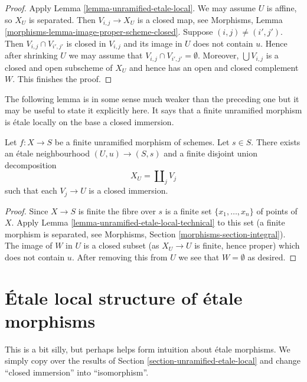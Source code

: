 \begin{proof}
Apply
Lemma \ref{lemma-unramified-etale-local}.
We may assume $U$ is affine, so $X_U$ is separated.
Then $V_{i, j} \to X_U$ is a closed map, see
Morphisms, Lemma \ref{morphisms-lemma-image-proper-scheme-closed}.
Suppose $(i, j) \not = (i', j')$.
Then $V_{i, j} \cap V_{i', j'}$ is closed in $V_{i, j}$ and
its image in $U$ does not contain $u$.
Hence after shrinking $U$ we may assume that
$V_{i, j} \cap V_{i', j'} = \emptyset$. Moreover, $\bigcup V_{i, j}$ is
a closed and open subscheme of $X_U$ and hence has an open and closed
complement $W$. This finishes the proof.
\end{proof}

\noindent
The following lemma is in some sense much weaker than the preceding one
but it may be useful to state it explicitly here. It says that a finite
unramified morphism is \'etale locally on the base a closed immersion.

\begin{lemma}
\label{lemma-finite-unramified-etale-local}
Let $f : X \to S$ be a finite unramified morphism of schemes.
Let $s \in S$.
There exists an \'etale neighbourhood $(U, u) \to (S, s)$
and a finite disjoint union decomposition
$$
X_U = \coprod\nolimits_j V_j
$$
such that each $V_j \to U$ is a closed immersion.
\end{lemma}

\begin{proof}
Since $X \to S$ is finite the fibre over $s$ is a finite set
$\{x_1, \ldots, x_n\}$ of points of $X$. Apply
Lemma \ref{lemma-unramified-etale-local-technical}
to this set (a finite morphism is separated, see
Morphisms, Section \ref{morphisms-section-integral}).
The image of $W$ in $U$ is a closed
subset (as $X_U \to U$ is finite, hence proper) which does not
contain $u$. After removing this from $U$ we see that $W = \emptyset$
as desired.
\end{proof}




\section{\'Etale local structure of \'etale morphisms}
\label{section-etale-local-etale}

\noindent
This is a bit silly, but perhaps helps form intuition about \'etale
morphisms. We simply copy over the results of
Section \ref{section-unramified-etale-local}
and change ``closed immersion'' into ``isomorphism''.

